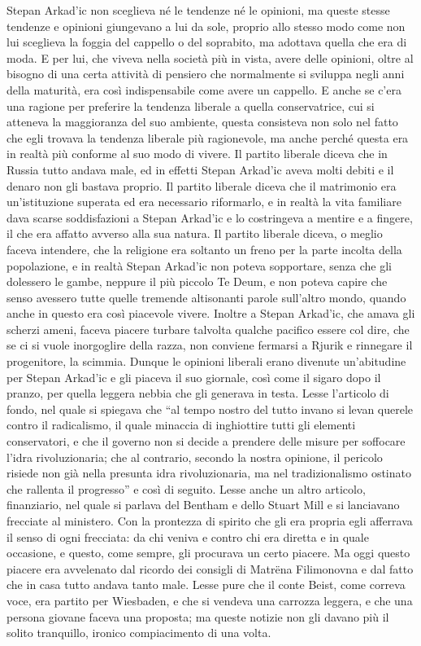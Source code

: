 Stepan Arkad'ic non sceglieva né le tendenze né le opinioni, ma queste stesse tendenze e opinioni giungevano a lui da sole, proprio allo stesso modo come non lui sceglieva la foggia del cappello o del soprabito, ma adottava quella che era di moda. E per lui, che viveva nella società più in vista, avere delle opinioni, oltre al bisogno di una certa attività di pensiero che normalmente si sviluppa negli anni della maturità, era così indispensabile come avere un cappello. E anche se c'era una ragione per preferire la tendenza liberale a quella conservatrice, cui si atteneva la maggioranza del suo ambiente, questa consisteva non solo nel fatto che egli trovava la tendenza liberale più ragionevole, ma anche perché questa era in realtà più conforme al suo modo di vivere. Il partito liberale diceva che in Russia tutto andava male, ed in effetti Stepan Arkad'ic aveva molti debiti e il denaro non gli bastava proprio. Il partito liberale diceva che il matrimonio era un'istituzione superata ed era necessario riformarlo, e in realtà la vita familiare dava scarse soddisfazioni a Stepan Arkad'ic e lo costringeva a mentire e a fingere, il che era affatto avverso alla sua natura. Il partito liberale diceva, o meglio faceva intendere, che la religione era soltanto un freno per la parte incolta della popolazione, e in realtà Stepan Arkad'ic non poteva sopportare, senza che gli dolessero le gambe, neppure il più piccolo Te Deum, e non poteva capire che senso avessero tutte quelle tremende altisonanti parole sull'altro mondo, quando anche in questo era così piacevole vivere. Inoltre a Stepan Arkad'ic, che amava gli scherzi ameni, faceva piacere turbare talvolta qualche pacifico essere col dire, che se ci si vuole inorgoglire della razza, non conviene fermarsi a Rjurik e rinnegare il progenitore, la scimmia. Dunque le opinioni liberali erano divenute un'abitudine per Stepan Arkad'ic e gli piaceva il suo giornale, così come il sigaro dopo il pranzo, per quella leggera nebbia che gli generava in testa. Lesse l'articolo di fondo, nel quale si spiegava che ``al tempo nostro del tutto invano si levan querele contro il radicalismo, il quale minaccia di inghiottire tutti gli elementi conservatori, e che il governo non si decide a prendere delle misure per soffocare l'idra rivoluzionaria; che al contrario, secondo la nostra opinione, il pericolo risiede non già nella presunta idra rivoluzionaria, ma nel tradizionalismo ostinato che rallenta il progresso'' e così di seguito. Lesse anche un altro articolo, finanziario, nel quale si parlava del Bentham e dello Stuart Mill e si lanciavano frecciate al ministero. Con la prontezza di spirito che gli era propria egli afferrava il senso di ogni frecciata: da chi veniva e contro chi era diretta e in quale occasione, e questo, come sempre, gli procurava un certo piacere. Ma oggi questo piacere era avvelenato dal ricordo dei consigli di Matrëna Filimonovna e dal fatto che in casa tutto andava tanto male. Lesse pure che il conte Beist, come correva voce, era partito per Wiesbaden, e che si vendeva una carrozza leggera, e che una persona giovane faceva una proposta; ma queste notizie non gli davano più il solito tranquillo, ironico compiacimento di una volta. 

